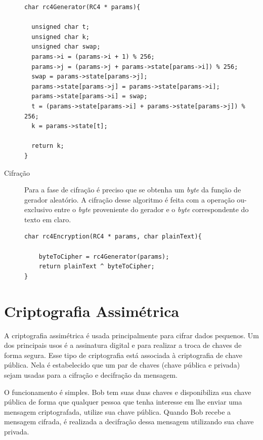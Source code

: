 \begin{description}
    \begin{lstlisting}[caption={Código Geração Aleatório de \textit{bytes}}, label=randomGeneration]
char rc4Generator(RC4 * params){

  unsigned char t;
  unsigned char k;
  unsigned char swap;
  params->i = (params->i + 1) % 256;
  params->j = (params->j + params->state[params->i]) % 256;
  swap = params->state[params->j];
  params->state[params->j] = params->state[params->i];
  params->state[params->i] = swap;
  t = (params->state[params->i] + params->state[params->j]) % 256;
  k = params->state[t];

  return k;
}
    \end{lstlisting}

	\item [Cifração] Para a fase de cifração é preciso que se obtenha um \textit{byte} da função de gerador aleatório. A cifração desse algoritmo é feita com a operação ou-exclusivo entre o \textit{byte} proveniente do gerador e o \textit{byte} correspondente do texto em claro.

    \begin{lstlisting}[caption={Código Cifração de \textit{bytes}}, label=encryption]
char rc4Encryption(RC4 * params, char plainText){

	byteToCipher = rc4Generator(params);
	return plainText ^ byteToCipher;
}
    \end{lstlisting}

\end{description}


%
\section{Criptografia Assimétrica}
\label{assymmetric-cryptography}

%
A criptografia assimétrica é usada principalmente para cifrar dados pequenos. Um dos principais usos é a assinatura digital e para realizar a troca de chaves de forma segura. Esse tipo de criptografia está associada à criptografia de chave pública. Nela é estabelecido que um par de chaves (chave pública e privada) sejam usadas para a cifração e decifração da mensagem. 

%
O funcionamento é simples. Bob tem suas duas chaves e disponibiliza sua chave pública de forma que qualquer pessoa que tenha interesse em lhe enviar uma mensagem criptografada, utilize sua chave pública. Quando Bob recebe a mensagem cifrada, é realizada a decifração dessa mensagem utilizando sua chave privada.

